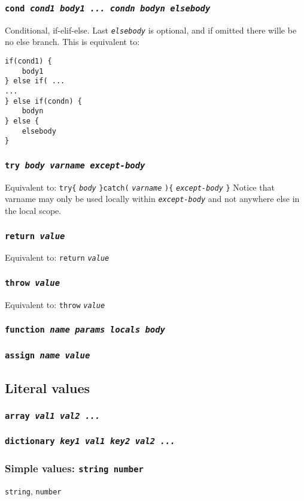 \documentclass[10pt]{article}
\newcommand{\ch}[1]{{\tt\em #1}}
\begin{document}
\subsubsection{\tt cond \em cond1 body1 ... condn bodyn elsebody}
Conditional, if-elif-else. Last \ch{elsebody} is optional, and if omitted there wille be no else branch.
This is equivalent to:
\begin{verbatim}
if(cond1) {
    body1
} else if( ...
...
} else if(condn) {
    bodyn
} else {
    elsebody
}
\end{verbatim}
\subsubsection{\tt try \em body varname except-body}
Equivalent to: \verb|try{| \ch{body} \verb|}catch(| \ch{varname} \verb|){| \ch{except-body} \verb|}|
Notice that varname may only be used locally within \ch{except-body} and not anywhere else in the local scope.
\subsubsection{\tt return \em value}
Equivalent to: \verb|return| \ch{value}
\subsubsection{\tt throw \em value}
Equivalent to: \verb|throw| \ch{value}
\subsubsection{\tt function \em name params locals body}
\subsubsection{\tt assign \em name value}

\subsection{Literal values}
\subsubsection{\tt array \em val1 val2 ...}
\subsubsection{\tt dictionary \em key1 val1 key2 val2 ...}
\subsubsection{Simple values: \tt string number} 
{\tt string}, {\tt number}
\end{document}
